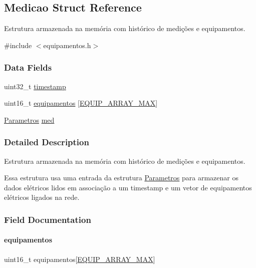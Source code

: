 \hypertarget{struct_medicao}{}\subsection{Medicao Struct Reference}
\label{struct_medicao}


Estrutura armazenada na memória com histórico de medições e equipamentos.  




{\ttfamily \#include $<$equipamentos.\+h$>$}

\subsubsection*{Data Fields}
\begin{DoxyCompactItemize}
\item 
uint32\+\_\+t \hyperlink{struct_medicao_ab20b0c7772544cf5d318507f34231fbe}{timestamp}
\item 
uint16\+\_\+t \hyperlink{struct_medicao_a98ae007405142605026a286a04dd6d51}{equipamentos} \mbox{[}\hyperlink{defines_8h_ae4b347db921cb574228cda0f65b38c1e}{E\+Q\+U\+I\+P\+\_\+\+A\+R\+R\+A\+Y\+\_\+\+M\+AX}\mbox{]}
\item 
\hyperlink{struct_parametros}{Parametros} \hyperlink{struct_medicao_aa2e947ae4fcdfb65d9b7e1763b95fe4d}{med}
\end{DoxyCompactItemize}


\subsubsection{Detailed Description}
Estrutura armazenada na memória com histórico de medições e equipamentos. 

Essa estrutura usa uma entrada da estrutura \hyperlink{struct_parametros}{Parametros} para armazenar os dados elétricos lidos em associação a um timestamp e um vetor de equipamentos elétricos ligados na rede. 

\subsubsection{Field Documentation}
\mbox{\label{struct_medicao_a98ae007405142605026a286a04dd6d51}} 
\paragraph{\texorpdfstring{equipamentos}{equipamentos}}
{\footnotesize\ttfamily uint16\+\_\+t equipamentos\mbox{[}\hyperlink{defines_8h_ae4b347db921cb574228cda0f65b38c1e}{E\+Q\+U\+I\+P\+\_\+\+A\+R\+R\+A\+Y\+\_\+\+M\+AX}\mbox{]}}

